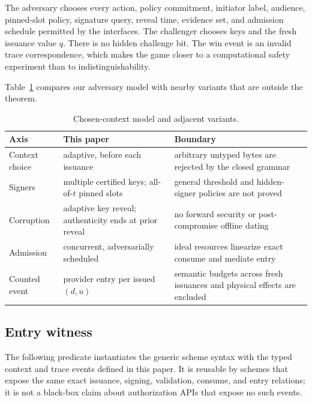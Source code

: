 \documentclass[10pt]{article}
\begin{document}
The adversary chooses every action, policy commitment, initiator label,
audience, pinned-slot policy, signature query, reveal time, evidence set, and
admission schedule permitted by the interfaces. The challenger chooses keys
and the fresh issuance value $q$. There is no hidden challenge bit. The win
event is an invalid trace correspondence, which makes the game closer to a
computational safety experiment than to indistinguishability.

Table~\ref{tab:model-variants} compares our adversary model with nearby variants
that are outside the theorem.

\begin{table}[ht]
\centering
\caption{Chosen-context model and adjacent variants.}
\label{tab:model-variants}
\small
\begin{tabularx}{\textwidth}{@{}>{\raggedright\arraybackslash}p{}>{\raggedright\arraybackslash}p{}>{\raggedright\arraybackslash}X@{}}
\toprule
Axis & This paper & Boundary \\
\midrule
Context choice & adaptive, before each issuance & arbitrary untyped bytes are rejected by the closed grammar \\
Signers & multiple certified keys; all-of-$t$ pinned slots & general threshold and hidden-signer policies are not proved \\
Corruption & adaptive key reveal; authenticity ends at prior reveal & no forward security or post-compromise offline dating \\
Admission & concurrent, adversarially scheduled & ideal resources linearize exact consume and mediate entry \\
Counted event & provider entry per issued $(d,u)$ & semantic budgets across fresh issuances and physical effects are excluded \\
\bottomrule
\end{tabularx}
\normalsize
\end{table}

\subsection{Entry witness}

The following predicate instantiates the generic scheme syntax with the typed
context and trace events defined in this paper. It is reusable by schemes that
expose the same exact issuance, signing, validation, consume, and entry
relations; it is not a black-box claim about authorization APIs that expose no
such events.
\end{document}
